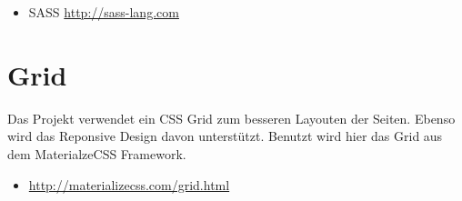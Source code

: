 \documentclass[Info_VK_Website_Dokumentation.tex]{subfiles}
\begin{document}
\begin{itemize}
	\item SASS \url{http://sass-lang.com} 
\end{itemize}

\section{Grid}

Das Projekt verwendet ein CSS Grid zum besseren Layouten der Seiten. Ebenso wird das Reponsive Design davon unterstützt. Benutzt wird hier das Grid aus dem MaterialzeCSS Framework.

\begin{itemize}
 	\item \url{http://materializecss.com/grid.html} 
\end{itemize} 
\end{document}
